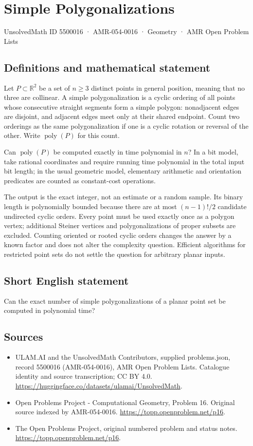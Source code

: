 \documentclass[11pt,a4paper]{article}
\begin{document}
\section*{Simple Polygonalizations}\label{5500016}
{\small UnsolvedMath ID 5500016 · AMR-054-0016 · Geometry · AMR Open Problem Lists}
\subsection{Definitions and mathematical statement}
Let $P\subset\mathbb R^2$ be a set of $n\ge3$ distinct points
in general position, meaning that no three are collinear.
A simple polygonalization is a cyclic ordering of all points
whose consecutive straight segments form a simple polygon:
nonadjacent edges are disjoint, and adjacent edges meet only
at their shared endpoint. Count two orderings as the same
polygonalization if one is a cyclic rotation or reversal of
the other. Write $\operatorname{poly}(P)$ for this count.

Can $\operatorname{poly}(P)$ be computed exactly in time polynomial
in $n$? In a bit model, take rational coordinates and require
running time polynomial in the total input bit length; in the
usual geometric model, elementary arithmetic and orientation
predicates are counted as constant-cost operations.

The output is the exact integer, not an estimate or a random
sample. Its binary length is polynomially bounded because there
are at most $(n-1)!/2$ candidate undirected cyclic orders.
Every point must be used exactly once as a polygon vertex;
additional Steiner vertices and polygonalizations of proper
subsets are excluded. Counting oriented or rooted cyclic orders
changes the answer by a known factor and does not alter the
complexity question. Efficient algorithms for restricted point
sets do not settle the question for arbitrary planar inputs.
\subsection{Short English statement}
Can the exact number of simple polygonalizations of a planar point set be computed in polynomial time?
\subsection{Sources}
\begin{itemize}
\item[S1] ULAM.AI and the UnsolvedMath Contributors, supplied problems.json, record 5500016 (AMR-054-0016), AMR Open Problem Lists. Catalogue identity and source transcription; CC BY 4.0.
\url{https://huggingface.co/datasets/ulamai/UnsolvedMath}.
\item[S2] Open Problems Project - Computational Geometry, Problem 16. Original source indexed by AMR-054-0016.
\url{https://topp.openproblem.net/p16}.
\item[S3] The Open Problems Project, original numbered problem and status notes.
\url{https://topp.openproblem.net/p16}.
\end{itemize}
\end{document}
